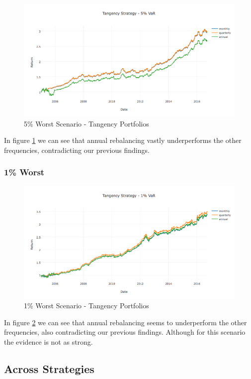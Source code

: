 \documentclass[paper=a4, fontsize=11pt]{scrartcl} %
\numberwithin{equation}{section} %
\numberwithin{figure}{section} %
\numberwithin{table}{section} %
\begin{document}
\begin{figure}[H]
  \includegraphics[width=\linewidth]{TG5.png}
  \caption{5\% Worst Scenario - Tangency Portfolios}
  \label{fig:TG5}
\end{figure}

In figure \ref{fig:TG5} we can see that annual rebalancing vastly underperforms the other frequencies, contradicting our previous findings.

\subsubsection{1\% Worst}

\begin{figure}[H]
  \includegraphics[width=\linewidth]{TG1.png}
  \caption{1\% Worst Scenario - Tangency Portfolios}
  \label{fig:TG1}
\end{figure}

In figure \ref{fig:TG1} we can see that annual rebalancing seems to underperform the other frequencies, also contradicting our previous findings. Although for this scenario the evidence is not as strong.

\subsection{Across Strategies}
\end{document}
